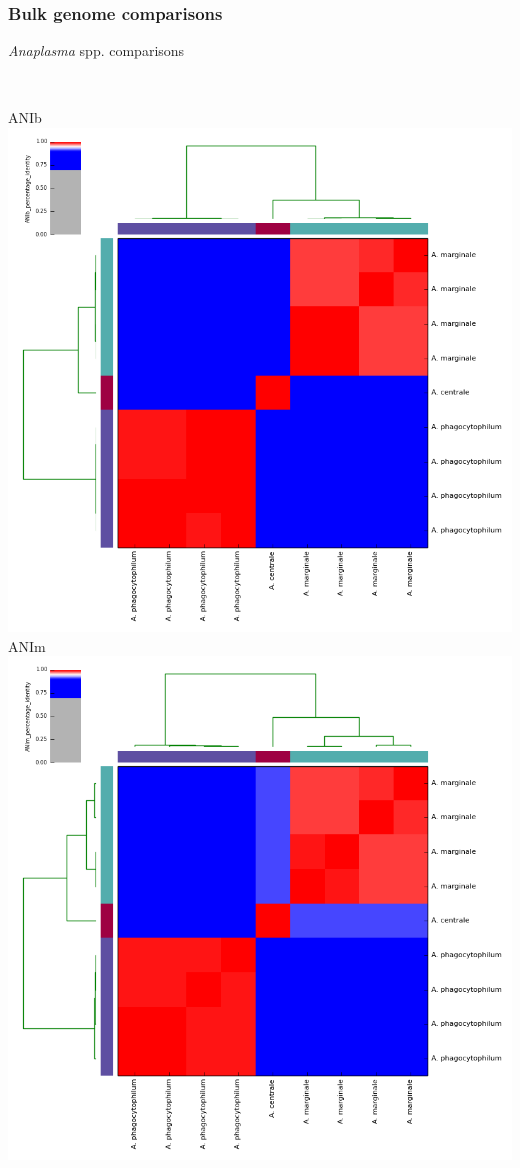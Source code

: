 %
\begin{frame}
  \frametitle{Bulk genome comparisons}
  \textit{Anaplasma} spp. comparisons \\~\\
  \begin{columns}
      ANIb \\
      \includegraphics[width=\textwidth]{images/ANIb_percentage_identity}
      ANIm \\
      \includegraphics[width=\textwidth]{images/ANIm_percentage_identity}    

\end{columns}
\end{frame}
